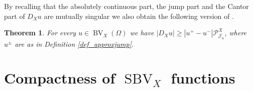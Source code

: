 \documentclass[12pt,a4paper]{amsart}
\theoremstyle{definition}
\theoremstyle{plain}
\newtheorem{teo}[defi]{Theorem}
\newcommand{\pxu}{{\mathcal{P}^X_{\mathcal{J}_u}}}
\newcommand{\sbv}{\operatorname{SBV}}
\newcommand{\bv}{\operatorname{BV}}
\begin{document}
By recalling that the absolutely continuous part, the jump part and the Cantor part of $D_Xu$ are mutually singular we also obtain the following version of \cite[Theorem 1.3 (i)]{dv}.

\begin{teo}
	For every $u\in \bv_X(\Omega)$ we have $|D_Xu|\geq  |u^+-u^-|\pxu$, where $u^\pm$ are as in Definition \ref{def_approxjump}.
\end{teo}





\section{Compactness of \texorpdfstring{$\sbv_X$}{SBVX} functions}\label{sec_compactness}
\end{document}

